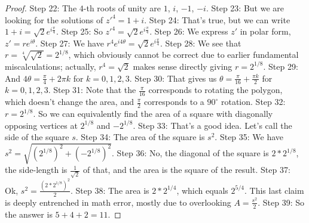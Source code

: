 \documentclass{article}
\begin{document}
\begin{proof}
Step 22: The $4$-th roots of unity are $1$, $i$, $-1$, $-i$.
Step 23: But we are looking for the solutions of $z'^4=1+i$.
Step 24: That's true, but we can write $1+i=\sqrt{2} e^{i \frac{\pi}{4}}$.
Step 25: So $z'^4=\sqrt{2} e^{i \frac{\pi}{4}}$.
Step 26: We express $z'$ in polar form, $z'=r e^{i \theta}$.
Step 27: We have $r^4 e^{i 4 \theta}=\sqrt{2} e^{i \frac{\pi}{4}}$.
Step 28: We see that $r=\sqrt[4]{\sqrt{2}}=2^{1/8}$, which obviously cannot be correct due to earlier fundamental miscalculations; actually, $r^4 = \sqrt{2}$ makes sense directly giving $r=2^{1/8}$.
Step 29: And $4 \theta = \frac{\pi}{4}+2\pi k$ for $k=0,1,2,3$.
Step 30: That gives us $\theta = \frac{\pi}{16}+\frac{\pi k}{2}$ for $k=0,1,2,3$.
Step 31: Note that the $\frac{\pi}{16}$ corresponds to rotating the polygon, which doesn't change the area, and $\frac{\pi}{2}$ corresponds to a $90^\circ$ rotation.
Step 32: $r=2^{1/8}$. So we can equivalently find the area of a square with diagonally opposing vertices at $2^{1/8}$ and $-2^{1/8}$.
Step 33: That's a good idea. Let's call the side of the square $s$.
Step 34: The area of the square is $s^2$.
Step 35: We have $s^2=\sqrt{(2^{1/8})^2+(-2^{1/8})^2}$.
Step 36: No, the diagonal of the square is $2*2^{1/8}$, the side-length is $\frac{1}{\sqrt{2}}$ of that, and the area is the square of the result.
Step 37: Ok, $s^2=\frac{(2*2^{1/8})^2}{2}$.
Step 38: The area is $2*2^{1/4}$, which equals $2^{5/4}$. This last claim is deeply entrenched in math error, mostly due to overlooking $A=\frac{s^2}{2}$.
Step 39: So the answer is $5+4+2=\boxed{11}$.
\end{proof}
\end{document}
